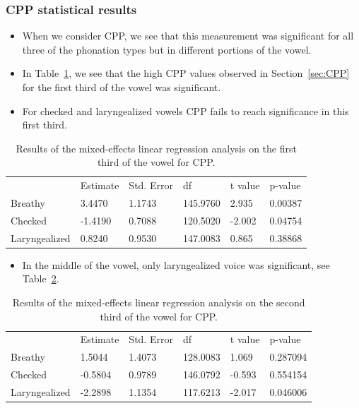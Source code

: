 \documentclass[12pt, letterpaper]{article}
\providecommand{\lsptoprule}{\midrule\toprule}
\providecommand{\lspbottomrule}{\bottomrule\midrule}
\begin{document}
\subsubsection{CPP statistical results} \label{sec:StatsCPP}

\begin{itemize}
	\item When we consider CPP, we see that this measurement was significant for all three of the phonation types but in different portions of the vowel. 
	\item In Table~\ref{tab:CPP_First}, we see that the high CPP values observed in Section~\ref{sec:CPP} for the first third of the vowel was significant. 
	\item For checked and laryngealized vowels CPP fails to reach significance in this first third. 
\end{itemize}

\begin{table}[!h]
	\centering
	\caption{Results of the mixed-effects linear regression analysis on the first third of the vowel for CPP. }
	\label{tab:CPP_First}
	 \begin{tabular}{llllll}
	  \lsptoprule
						&  Estimate  & Std. Error & df & t value & p-value \\
	  	Breathy   		&  3.4470   &  1.1743 & 145.9760 &  2.935 & 0.00387 \\
		Checked    		& -1.4190   &  0.7088 & 120.5020 & -2.002 & 0.04754 \\
		Laryngealized	&  0.8240   &  0.9530 & 147.0083 &  0.865 & 0.38868 \\
	  \lspbottomrule
	 \end{tabular}
\end{table}

\begin{itemize}
	\item In the middle of the vowel, only laryngealized voice was significant, see Table~\ref{tab:CPP_Second}. 
\end{itemize}


\begin{table}[!h]
	\centering
	\caption{Results of the mixed-effects linear regression analysis on the second third of the vowel for CPP. }
	\label{tab:CPP_Second}
	 \begin{tabular}{llllll}
	  \lsptoprule
						&  Estimate  & Std. Error & df & t value & p-value \\
	  	Breathy   		&  1.5044   &  1.4073 & 128.0083 &  1.069 & 0.287094 \\
		Checked    		& -0.5804   &  0.9789 & 146.0792 & -0.593 & 0.554154 \\
		Laryngealized	& -2.2898   &  1.1354 & 117.6213 & -2.017 & 0.046006 \\
	  \lspbottomrule
	 \end{tabular}
\end{table}
\end{document}
